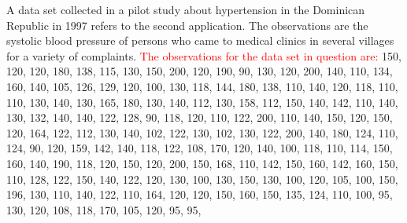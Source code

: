\documentclass[twoside,leqno,11pt]{article}
\begin{document}
A data set collected in a pilot study about hypertension in the Dominican Republic in 1997 refers to the second application. The observations are the systolic blood pressure of persons who 
came to medical clinics in several villages for a variety of complaints. 
\textcolor{red}{The observations for the data set in question are:} 
         150,
         120,
         120,
         180,
         138,
         115,
         130,
         150,
         200,
         120,
         190,
         90,
         130,
         120,
         200,
         140,
         110,
         134,
         160,
         140,
         105,
         126,
         129,
         120,
         100,
         130,
         118,
         144,
         180,
         138,
         110,
         140,
         120,
         118,
         110,
         110,
         130,
         140,
         130,
         165,
         180,
         130,
         140,
         112,
         130,
         158,
         112,
         150,
         140,
         142,
         110,
         140,
         130,
         132,
         140,
         140,
         122,
         128,
         90,
         118,
         120,
         110,
         122,
         200,
         110,
         140,
         150,
         120,
         150,
         120,
         164,
         122,
         112,
         130,
         140,
         102,
         122,
         130,
         102,
         130,
         122,
         200,
         140,
         180,
         124,
         110,
         124,
         90,
         120,
         159,
         142,
         140,
         118,
         122,
         108,
         170,
         120,
         140,
         100,
         118,
         110,
         114,
         150,
         160,
         140,
         190,
         118,
         120,
         150,
         120,
         200,
         150,
         168,
         110,
         142,
         150,
         160,
         142,
         160,
         150,
         110,
         128,
         122,
         150,
         140,
         122,
         120,
         130,
         100,
         130,
         150,
         130,
         100,
         120,
         105,
         100,
         150,
         196,
         130,
         110,
         140,
         122,
         110,
         164,
         120,
         120,
         150,
         160,
         150,
         135,
         124,
         110,
         100,
         95,
         130,
         120,
         108,
         118,
         170,
         105,
         120,
         95,
         95,
\end{document}
